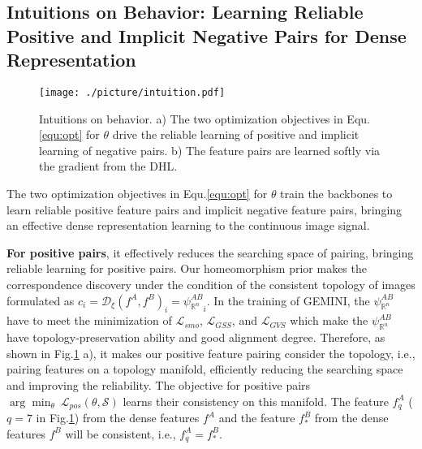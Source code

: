 \subsection{Intuitions on Behavior: Learning Reliable Positive and Implicit Negative Pairs for Dense Representation}\label{sec:int}
\begin{figure}
  \centering
  \texttt{[image: ./picture/intuition.pdf]}
  \caption{Intuitions on behavior. a) The two optimization objectives in Equ.\ref{equ:opt} for $\theta$ drive the reliable learning of positive and implicit learning of negative pairs. b) The feature pairs are learned softly via the gradient from the DHL.}\label{method:int}
\end{figure}
The two optimization objectives in Equ.\ref{equ:opt} for $\theta$ train the backbones to learn reliable positive feature pairs and implicit negative feature pairs, bringing an effective dense representation learning to the continuous image signal.

\textbf{For positive pairs}, it effectively reduces the searching space of pairing, bringing reliable learning for positive pairs. Our homeomorphism prior makes the correspondence discovery under the condition of the consistent topology of images formulated as $c_{i}=\mathcal{D}_{\xi}(f^{A},f^{B})_{i}={\psi^{AB}_{\mathbb{R}^{n}}}_{i}$. In the training of GEMINI, the $\psi^{AB}_{\mathbb{R}^{n}}$ have to meet the minimization of $\mathcal{L}_{smo}$, $\mathcal{L}_{GSS}$, and $\mathcal{L}_{GVS}$ which make the $\psi^{AB}_{\mathbb{R}^{n}}$ have topology-preservation ability and good alignment degree. Therefore, as shown in Fig.\ref{method:int} a), it makes our positive feature pairing consider the topology, i.e., pairing features on a topology manifold, efficiently reducing the searching space and improving the reliability. The objective for positive pairs $\arg\min_{\theta}\ \mathcal{L}_{pos}(\theta,\mathcal{S})$ learns their consistency on this manifold. The feature $f^{A}_{q}$ ($q=7$ in Fig.\ref{method:int}) from the dense features $f^{A}$ and the feature $f^{B}_{*}$ from the dense features $f^{B}$ will be consistent, i.e., $f^{A}_{q}=f^{B}_{*}$.

